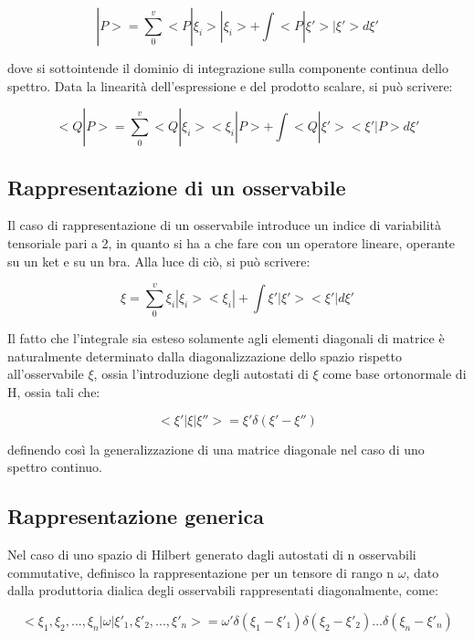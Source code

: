 \documentclass{article}
\begin{document}
\begin{equation}
    |P>= \sum_{0}^{v} <P|\xi_i>|\xi_i>+ \int <P|\xi'>|\xi'>d\xi'
\end{equation}

dove si sottointende il dominio di integrazione sulla componente continua dello spettro.
Data la linearità dell'espressione e del prodotto scalare, si può scrivere:

\begin{equation}
    <Q|P>= \sum_{0}^{v} <Q|\xi_i><\xi_i|P>+ \int <Q|\xi'><\xi'|P>d\xi'
\end{equation}


\subsection{Rappresentazione di un osservabile}
Il caso di rappresentazione di un osservabile introduce un indice di variabilità tensoriale pari a 2, in quanto si ha a che fare con un operatore lineare, operante su un ket e su un bra.
Alla luce di ciò, si può scrivere:

\begin{equation}
    \xi = \sum_{0}^{v} \xi_i|\xi_i><\xi_i|+ \int \xi'|\xi'><\xi'|d\xi'
\end{equation}

Il fatto che l'integrale sia esteso solamente agli elementi diagonali di matrice è naturalmente determinato dalla diagonalizzazione
dello spazio rispetto all'osservabile $\xi$, ossia l'introduzione degli autostati di $\xi$ come base ortonormale di H, ossia tali che:

\begin{equation}
    <\xi' | \xi | \xi''>= \xi' \delta(\xi'-\xi'')
\end{equation}

definendo così la generalizzazione di una matrice diagonale nel caso di uno spettro continuo.

\subsection{Rappresentazione generica}

Nel caso di uno spazio di Hilbert generato dagli autostati di n osservabili commutative, definisco la rappresentazione per 
un tensore di rango n $\omega$, dato dalla produttoria dialica degli osservabili rappresentati diagonalmente, come:

\begin{equation}
    <\xi_1,\xi_2,...,\xi_n|\omega|\xi'_1,\xi'_2,...,\xi'_n> = \omega' \delta(\xi_1-\xi'_1)\delta(\xi_2-\xi'_2)...\delta(\xi_n-\xi'_n)
\end{equation}
\end{document}
